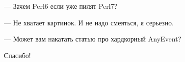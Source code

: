 \documentclass[14pt]{beamer}
\begin{document}
\begin{frame}
    \begin{center}
        --- Зачем Perl6 если уже пилят Perl7?
    \end{center}
\end{frame}

\begin{frame}
    \begin{center}
        --- Не хватает картинок. И не надо смеяться, я серьезно.
    \end{center}
\end{frame}

\begin{frame}
    \begin{center}
        --- Может вам накатать статью про хардкорный AnyEvent?
    \end{center}
\end{frame}

\begin{frame}
    \begin{center}
        Спасибо!
    \end{center}
\end{frame}
\end{document}
